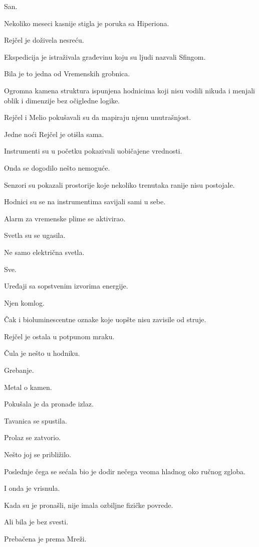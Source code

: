 San.

Nekoliko meseci kasnije stigla je poruka sa Hiperiona.

Rejčel je doživela nesreću.

\bigskip

Ekspedicija je istraživala građevinu koju su ljudi nazvali Sfingom.

Bila je to jedna od Vremenskih grobnica.

Ogromna kamena struktura ispunjena hodnicima koji nisu vodili nikuda i menjali oblik i dimenzije bez očigledne logike.

Rejčel i Melio pokušavali su da mapiraju njenu unutrašnjost.

Jedne noći Rejčel je otišla sama.

Instrumenti su u početku pokazivali uobičajene vrednosti.

Onda se dogodilo nešto nemoguće.

Senzori su pokazali prostorije koje nekoliko trenutaka ranije nisu postojale.

Hodnici su se na instrumentima savijali sami u sebe.

Alarm za vremenske plime se aktivirao.

Svetla su se ugasila.

Ne samo električna svetla.

Sve.

Uređaji sa sopstvenim izvorima energije.

Njen komlog.

Čak i bioluminescentne oznake koje uopšte nisu zavisile od struje.

Rejčel je ostala u potpunom mraku.

Čula je nešto u hodniku.

Grebanje.

Metal o kamen.

Pokušala je da pronađe izlaz.

Tavanica se spustila.

Prolaz se zatvorio.

Nešto joj se približilo.

Poslednje čega se sećala bio je dodir nečega veoma hladnog oko ručnog zgloba.

I onda je vrisnula.

\bigskip

Kada su je pronašli, nije imala ozbiljne fizičke povrede.

Ali bila je bez svesti.

Prebačena je prema Mreži.

